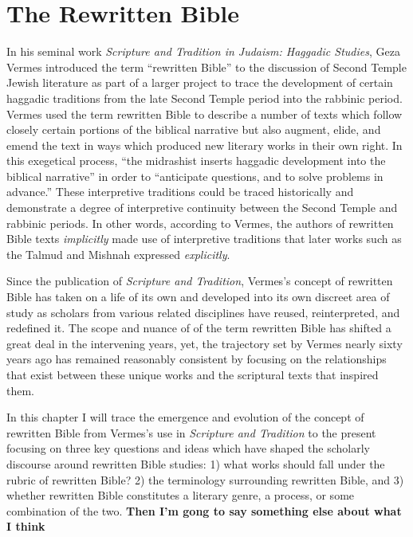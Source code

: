 \chapter{The Rewritten Bible}\label{the-rwb}

In his seminal work
\emph{Scripture and Tradition in Judaism: Haggadic Studies}, Geza Vermes
introduced the term ``rewritten Bible'' to the discussion of Second
Temple Jewish literature as part of a larger project to trace the
development of certain haggadic traditions from the late Second Temple
period into the rabbinic period. Vermes used the term rewritten Bible to
describe a number of texts which follow closely certain portions of the
biblical narrative but also augment, elide, and emend the text in ways
which produced new literary works in their own right. In this exegetical
process, ``the midrashist inserts haggadic development into the biblical
narrative'' in order to ``anticipate questions, and to solve problems in
advance.''\autocites[95]{vermes1961}[see also][]{vermes_zsengeller2014}
These interpretive traditions could be traced historically and
demonstrate a degree of interpretive continuity between the Second
Temple and rabbinic periods. In other words, according to Vermes, the
authors of rewritten Bible texts \emph{implicitly} made use of
interpretive traditions that later works such as the Talmud and Mishnah
expressed \emph{explicitly}.

Since the publication of \emph{Scripture and Tradition}, Vermes's
concept of rewritten Bible has taken on a life of its own and developed
into its own discreet area of study as scholars from various related
disciplines have reused, reinterpreted, and redefined it. The scope and
nuance of of the term rewritten Bible has shifted a great deal in the
intervening years, yet, the trajectory set by Vermes nearly sixty years
ago has remained reasonably consistent by focusing on the relationships
that exist between these unique works and the scriptural texts that
inspired them.

In this chapter I will trace the emergence and evolution of the concept
of rewritten Bible from Vermes's use in \emph{Scripture and Tradition}
to the present focusing on three key questions and ideas which have
shaped the scholarly discourse around rewritten Bible studies: 1) what
works should fall under the rubric of rewritten Bible? 2) the
terminology surrounding rewritten Bible, and 3) whether rewritten Bible
constitutes a literary genre, a process, or some combination of the two.
\textbf{Then I'm gong to say something else about what I think}

